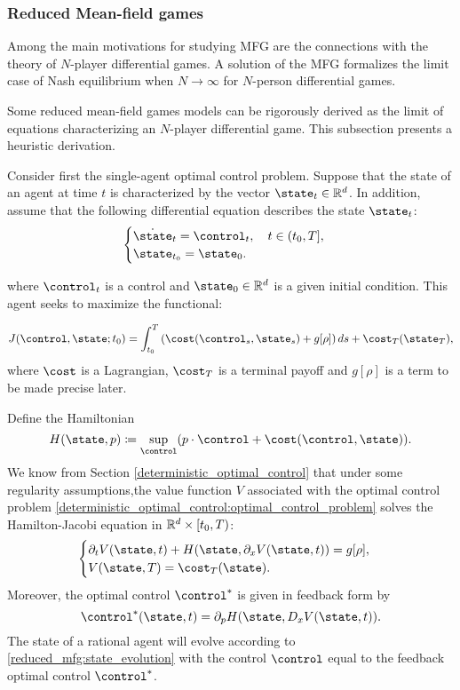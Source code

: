\documentclass{article}
\begin{document}
\subsubsection{Reduced Mean-field games}\label{reduced_mfg}
Among the main motivations for studying MFG are the connections with
 the theory of $N$-player differential games. A solution of the MFG formalizes 
 the limit case of Nash equilibrium when $N \to \infty$ for $N$-person differential games.

Some reduced mean-field games models can be rigorously derived as the limit 
of equations characterizing an $N$-player differential game. This subsection presents a heuristic derivation.

Consider first the single-agent optimal control problem.
Suppose that the state of an agent at time $t$ is characterized by the vector 
$\state_t \in \RR^d$.
In addition, assume that the following differential equation describes the state $\state_t$:
\begin{equation}\label{reduced_mfg:state_evolution}
\begin{cases}
    \dot{ \state}_t = {\control}_t,\quad t\in (t_0,T],\\
    {\state}_{t_0} = \state_0.
\end{cases}
\end{equation}

where $\control_t$ is a control and $\state_0\in\RR^d$ is a given initial condition. This agent seeks to maximize the functional:

\begin{equation}\label{reduced_mfg:payoff_functional}
    J({ \control},\state; t_0) = \int_{t_0}^T \left(\cost({\control}_s,{\state}_s) + g[\rho] \right) ds + \cost_T({ \state}_T),
\end{equation}
where $\cost$ is a Lagrangian, $\cost_T$ is a terminal payoff and $g[\rho]$ is a term to be made precise later. 

Define the Hamiltonian
\begin{equation}\label{reduced_mfg:hamiltonian}
        H(\state,p) \coloneqq \sup_{\control} ( p \cdot \control + \cost(\control,\state)).
\end{equation}
We know from Section
\eqref{deterministic_optimal_control}
that under some regularity assumptions,the value function $V$ associated with
the optimal control problem
\eqref{deterministic_optimal_control:optimal_control_problem} 
solves the Hamilton-Jacobi equation in $\mathbb{R}^d \times [t_0,T)$:
\begin{equation}\label{reduced_mfg:state_evolution_hamiltonian}
\begin{cases}
    \partial_t V (\state,t) + H(\state,\partial_x V(\state,t)) = g[\rho], \\
    V(\state,T) = \cost_T(\state).
\end{cases}
\end{equation}
Moreover, the optimal control $\control^*$ is given in feedback form by
$$\control^*(\state,t) = \partial_p H(\state, D_x V(\state, t)).$$
The state of a rational agent will evolve according to 
\eqref{reduced_mfg:state_evolution} with the control $\control$ equal to the feedback optimal control $\control^*$.
\end{document}
